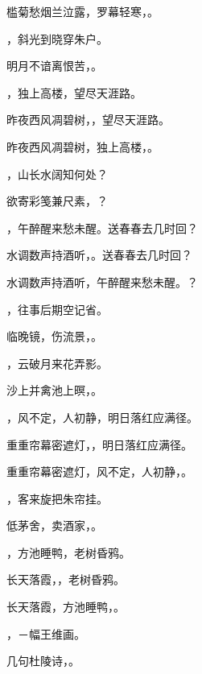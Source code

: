\documentclass[12pt, a4paper, addpoints]{exam}
\begin{document}
\begin{questions}
\question[1] 槛菊愁烟兰泣露，罗幕轻寒，\uline{\qquad\qquad\qquad}。

\question[1] \uline{\qquad\qquad\qquad}，斜光到晓穿朱户。

\question[1] 明月不谙离恨苦，\uline{\qquad\qquad\qquad}。

\question[1] \uline{\qquad\qquad\qquad}，独上高楼，望尽天涯路。

\question[1] 昨夜西风凋碧树，\uline{\qquad\qquad\qquad}，望尽天涯路。

\question[1] 昨夜西风凋碧树，独上高楼，\uline{\qquad\qquad\qquad}。

\question[1] \uline{\qquad\qquad\qquad}，山长水阔知何处？

\question[1] 欲寄彩笺兼尺素，\uline{\qquad\qquad\qquad}？

\question[1] \uline{\qquad\qquad\qquad}，午醉醒来愁未醒。送春春去几时回？

\question[1] 水调数声持酒听，\uline{\qquad\qquad\qquad}。送春春去几时回？

\question[1] 水调数声持酒听，午醉醒来愁未醒。\uline{\qquad\qquad\qquad}？

\question[1] \uline{\qquad\qquad\qquad}，往事后期空记省。

\question[1] 临晚镜，伤流景，\uline{\qquad\qquad\qquad}。

\question[1] \uline{\qquad\qquad\qquad}，云破月来花弄影。

\question[1] 沙上并禽池上暝，\uline{\qquad\qquad\qquad}。

\question[1] \uline{\qquad\qquad\qquad}，风不定，人初静，明日落红应满径。

\question[1] 重重帘幕密遮灯，\uline{\qquad\qquad\qquad}，明日落红应满径。

\question[1] 重重帘幕密遮灯，风不定，人初静，\uline{\qquad\qquad\qquad}。

\question[1] \uline{\qquad\qquad\qquad}，客来旋把朱帘挂。

\question[1] 低茅舍，卖酒家，\uline{\qquad\qquad\qquad}。

\question[1] \uline{\qquad\qquad\qquad}，方池睡鸭，老树昏鸦。

\question[1] 长天落霞，\uline{\qquad\qquad\qquad}，老树昏鸦。

\question[1] 长天落霞，方池睡鸭，\uline{\qquad\qquad\qquad}。

\question[1] \uline{\qquad\qquad\qquad}，－幅王维画。

\question[1] 几句杜陵诗，\uline{\qquad\qquad\qquad}。


\end{questions}
\end{document}

